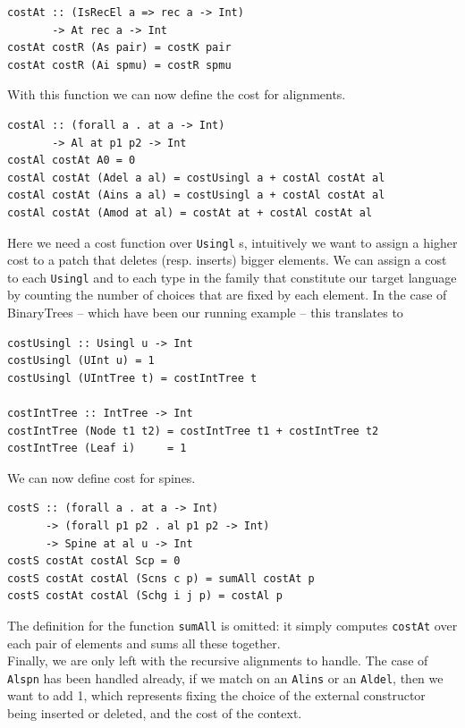 \documentclass[11pt, titlepage]{article}
\newcommand{\toHaskell}[1]{\texttt{#1}\xspace}
\newcommand{\alins}{\toHaskell{Alins}}
\newcommand{\aldel}{\toHaskell{Aldel}}
\newcommand{\alspn}{\toHaskell{Alspn}}
\begin{document}
\begin{verbatim}
costAt :: (IsRecEl a => rec a -> Int)
       -> At rec a -> Int
costAt costR (As pair) = costK pair
costAt costR (Ai spmu) = costR spmu
\end{verbatim}
With this function we can now define the cost for alignments.

\begin{verbatim}
costAl :: (forall a . at a -> Int)
       -> Al at p1 p2 -> Int
costAl costAt A0 = 0
costAl costAt (Adel a al) = costUsingl a + costAl costAt al
costAl costAt (Ains a al) = costUsingl a + costAl costAt al
costAl costAt (Amod at al) = costAt at + costAl costAt al
\end{verbatim}

Here we need a cost function over \toHaskell{Usingl}s, intuitively we want to assign a higher cost to a patch that deletes (resp. inserts) bigger elements. We can assign a cost to each \toHaskell{Usingl} and to each type in the family that constitute our target language by counting the number of choices that are fixed by each element. In the case of BinaryTrees -- which have been our running example -- this translates to

\begin{verbatim}
costUsingl :: Usingl u -> Int
costUsingl (UInt u) = 1
costUsingl (UIntTree t) = costIntTree t

costIntTree :: IntTree -> Int
costIntTree (Node t1 t2) = costIntTree t1 + costIntTree t2
costIntTree (Leaf i)     = 1
\end{verbatim}

We can now define cost for spines.

\begin{verbatim}
costS :: (forall a . at a -> Int)
      -> (forall p1 p2 . al p1 p2 -> Int)
      -> Spine at al u -> Int
costS costAt costAl Scp = 0
costS costAt costAl (Scns c p) = sumAll costAt p
costS costAt costAl (Schg i j p) = costAl p
\end{verbatim}

The definition for the function \toHaskell{sumAll} is omitted: it simply computes \toHaskell{costAt} over each pair of elements and sums all these together.
\\
Finally, we are only left with the recursive alignments to handle. The case of \alspn has been handled already, if we match on an \alins or an \aldel, then we want to add 1, which represents fixing the choice of the external constructor being inserted or deleted, and the cost of the context.
\end{document}
